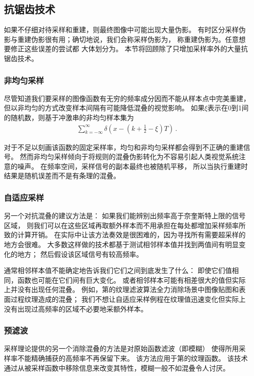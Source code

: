 \subsection{抗锯齿技术}\label{sub:抗锯齿技术}
如果不仔细对待采样和重建，则最终图像中可能出现大量伪影。
有时区分采样伪影与重建伪影很有用；确切地说，我们会称采样伪影为，
称重建伪影为。任意想要修正这些误差的尝试都
大体划分为。
本节将回顾除了只增加采样率外的大量抗锯齿技术。

\subsubsection*{非均匀采样}
尽管知道我们要采样的图像函数有无穷的频率成分因而不能从样本点中完美重建，
但以非均匀的方式改变样本间隔有可能降低混叠的视觉影响。
如果$\xi$表示在0到1间的随机数，则基于冲激串的非均匀样本集为
\begin{align*}
    \sum\limits_{k=-\infty}^{\infty}\delta\left(x-(k+\frac{1}{2}-\xi)T\right)\, .
\end{align*}

对于不足以刻画该函数的固定采样率，均匀和非均匀采样都会得到不正确的重建信号。
然而非均匀采样倾向于将规则的混叠伪影转化为不容易引起人类视觉系统注意的噪声。
在频率空间，采样信号的副本最终也被随机平移，
所以当执行重建时结果是随机误差而不是有条理的混叠。

\subsubsection*{自适应采样}
另一个对抗混叠的建议方法是：
如果我们能辨别出频率高于奈奎斯特上限的信号区域，
则我们可以在这些区域再取额外样本而不用承担在每处都增加采样频率所致的计算开销。
在实际中让该方法奏效是很困难的，因为寻找所有需要超采样的地方会很难。
大多数这样做的技术都基于测试相邻样本值并找到两值间有明显变化的地方；
然后假设该区域信号有较高频率。

通常相邻样本值不能确定地告诉我们它们之间到底发生了什么：
即使它们值相同，函数也可能在它们间有巨大变化。
或者相邻样本可能有相差很大的值但实际上并没有出现任何混叠。
例如，第的纹理滤波算法全力消除场景中图像贴图和表面过程纹理造成的混叠；
我们不想让自适应采样例程在纹理值迅速变化但实际上没有出现过高频率的区域不必要地采额外样本。

\subsubsection*{预滤波}
采样理论提供的另一个消除混叠的方法是对原始函数滤波（即模糊）
使得所用采样率不能精确捕获的高频率不再保留下来。
该方法应用于第的纹理函数。
该技术通过从被采样函数中移除信息来改变其特性，模糊一般不如混叠令人讨厌。

